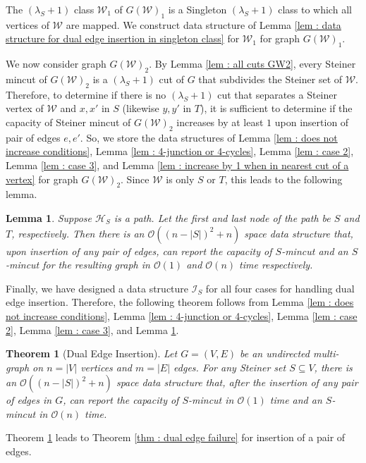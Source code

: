 \documentclass[letterpaper,11pt]{article}
\newtheorem{theorem}{Theorem}[]
\newtheorem{lemma}{Lemma}[]
\begin{document}
The $(\lambda_S+1)$ class ${\mathcal W}_1$ of $G({\mathcal W})_1$ is a Singleton $(\lambda_S+1)$ class to which all vertices of ${\mathcal W}$ are mapped. We construct data structure of Lemma \ref{lem : data structure for dual edge insertion in singleton class} for ${\mathcal W}_1$ for graph $G({\mathcal W})_1$. 

We now consider graph $G({\mathcal W})_2$. By Lemma \ref{lem : all cuts GW2}, every Steiner mincut of $G({\mathcal W})_2$ is a $(\lambda_S+1)$ cut of $G$ that subdivides the Steiner set of ${\mathcal W}$. Therefore, to determine if there is no $(\lambda_S+1)$ cut that separates a Steiner vertex of ${\mathcal W}$ and $x,x'$ in $S$ (likewise $y,y'$ in $T$), it is sufficient to determine if the capacity of Steiner mincut of $G({\mathcal W})_2$ increases by at least $1$ upon insertion of pair of edges $e,e'$. So, we store the data structures of Lemma \ref{lem : does not increase conditions}, Lemma \ref{lem : 4-junction or 4-cycles}, Lemma \ref{lem : case 2}, Lemma \ref{lem : case 3}, and Lemma \ref{lem : increase by 1 when in nearest cut of a vertex} for graph $G({\mathcal W})_2$. Since ${\mathcal W}$ is only $S$ or $T$, this leads to the following lemma.

\begin{lemma} \label{lem : case 4}
    Suppose ${\mathcal H}_S$ is a path. Let the first and last node of the path be $S$ and $T$, respectively. Then there is an ${\mathcal O}((n-|S|)^2+n)$ space data structure that, upon insertion of any pair of edges, can report the capacity of $S$-mincut and an $S$-mincut for the resulting graph in ${\mathcal O}(1)$ and ${\mathcal O}(n)$ time respectively.
\end{lemma}
Finally, we have designed a data structure ${\mathcal I}_S$ for all four cases for handling dual edge insertion. Therefore, the following theorem follows from Lemma \ref{lem : does not increase conditions}, Lemma \ref{lem : 4-junction or 4-cycles}, Lemma \ref{lem : case 2}, Lemma \ref{lem : case 3}, and Lemma \ref{lem : case 4}. \begin{theorem} [Dual Edge Insertion] \label{thm : dual edge insertion}
     Let $G=(V,E)$ be an undirected multi-graph on $n=|V|$ vertices and $m=|E|$ edges. For any Steiner set $S\subseteq V$, there is an ${\mathcal O}((n-|S|)^2+n)$ space data structure that, after the insertion of any pair of edges in $G$, can report the capacity of $S$-mincut in ${\mathcal O}(1)$ time and an $S$-mincut in ${\mathcal O}(n)$ time. 
\end{theorem}
Theorem \ref{thm : dual edge insertion} leads to Theorem \ref{thm : dual edge failure} for insertion of a pair of edges.
\end{document}
